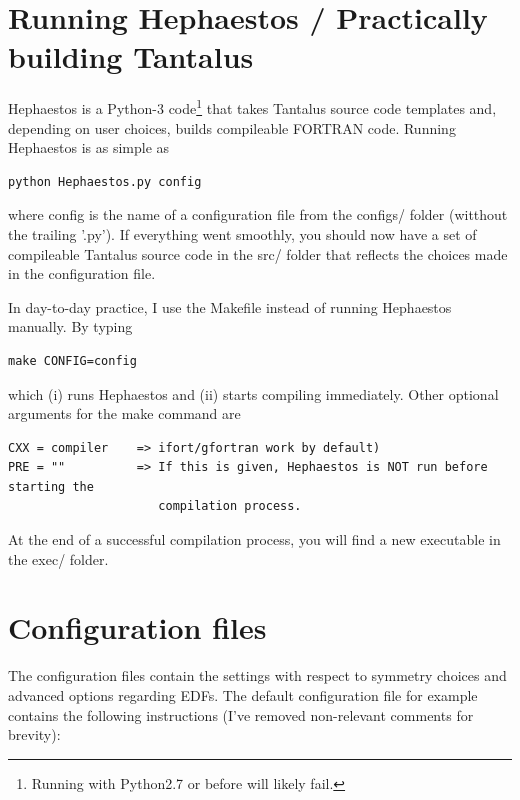 \documentclass[print,amsmath,amssymb,aps,prc,nofootinbib,notitlepage]{revtex4-1}
\begin{document}
\clearpage
\section{Running Hephaestos / Practically building Tantalus}

Hephaestos is a Python-3 code\footnote{Running with Python2.7 or before will 
likely fail.} that takes Tantalus source code templates and, depending on 
user choices, builds compileable FORTRAN code. Running Hephaestos is as simple 
as 

\begin{Verbatim}
python Hephaestos.py config
\end{Verbatim}

where \textrm{config} is the name of a configuration file from the \textrm{configs/} folder
(witthout the trailing '.py'). If everything went smoothly, you should now 
have a set of compileable Tantalus source code in the \textrm{src/} folder
that reflects the choices made in the configuration file.  

In day-to-day practice, I use the Makefile instead of running Hephaestos
manually. By typing 
%
\begin{Verbatim}
make CONFIG=config
\end{Verbatim}
%
which (i) runs Hephaestos and (ii) starts compiling immediately. Other optional
arguments for the make command are
%
\begin{Verbatim}
CXX = compiler    => ifort/gfortran work by default)
PRE = ""          => If this is given, Hephaestos is NOT run before starting the 
                     compilation process. 
\end{Verbatim}
%
At the end of a successful compilation process, you will find a new executable
in the \textrm{exec/} folder.


\section{Configuration files}

The configuration files contain the settings with respect to symmetry choices
and advanced options regarding EDFs. The default configuration file for 
example contains the following instructions (I've removed non-relevant 
comments for brevity):  
\end{document}
